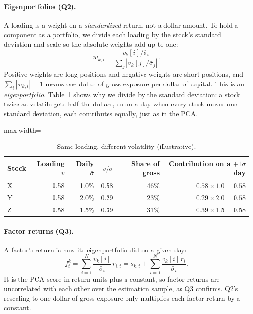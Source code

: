 \documentclass[12pt,letterpaper]{article}
\begin{document}
\paragraph{Eigenportfolios (Q2).} A loading is a weight on a
\emph{standardized} return, not a dollar amount. To hold a component as a
portfolio, we divide each loading by the stock's standard deviation and
scale so the absolute weights add up to one:
\[
w_{k,i}=\frac{v_k[i]/\bar\sigma_i}{\sum_{j}\left|v_k[j]/\bar\sigma_j\right|}.
\]
Positive weights are long positions and negative weights are short
positions, and $\sum_i|w_{k,i}|=1$ means one dollar of gross exposure per
dollar of capital. This is an \emph{eigenportfolio}.
Table~\ref{tab:primer-vol} shows why we divide by the standard deviation:
a stock twice as volatile gets half the dollars, so on a day when every
stock moves one standard deviation, each contributes equally, just as in
the PCA.

\begin{table}[!htbp]
\centering
\caption{Same loading, different volatility (illustrative).}
\label{tab:primer-vol}
\begin{adjustbox}{max width=\linewidth}
\begin{tabular}{lrrrrr}
\toprule
Stock & Loading $v$ & Daily $\bar\sigma$ & $v/\bar\sigma$ & Share of gross & Contribution on a $+1\bar\sigma$ day \\
\midrule
X & 0.58 & 1.0\% & 0.58 & 46\% & $0.58\times1.0=0.58$ \\
Y & 0.58 & 2.0\% & 0.29 & 23\% & $0.29\times2.0=0.58$ \\
Z & 0.58 & 1.5\% & 0.39 & 31\% & $0.39\times1.5=0.58$ \\
\bottomrule
\end{tabular}
\end{adjustbox}
\end{table}

\paragraph{Factor returns (Q3).} A factor's return is how its
eigenportfolio did on a given day:
\[
f^k_t=\sum_{i=1}^{N}\frac{v_k[i]}{\bar\sigma_i}\,r_{i,t}
=s_{k,t}+\sum_{i=1}^{N}\frac{v_k[i]\,\bar r_i}{\bar\sigma_i}.
\]
It is the PCA score in return units plus a constant, so factor returns
are uncorrelated with each other over the estimation sample, as Q3
confirms. Q2's rescaling to one dollar of gross exposure only multiplies
each factor return by a constant.
\end{document}
